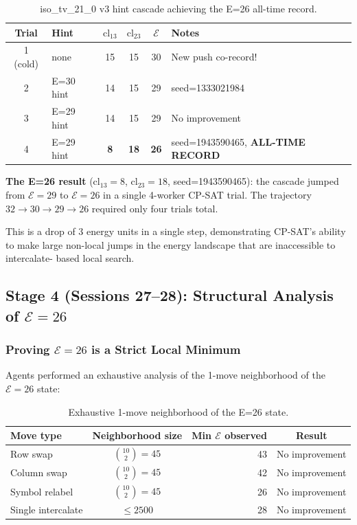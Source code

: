 \documentclass[11pt,a4paper]{article}
\theoremstyle{remark}
\newcommand{\cl}{\mathrm{cl}}
\newcommand{\E}{\mathcal{E}}
\begin{document}
\begin{table}[h]
\centering
\caption{iso\_tv\_21\_0 v3 hint cascade achieving the E=26 all-time record.}\label{tab:e26cascade}
\begin{tabular}{clcccl}
\toprule
Trial & Hint & $\cl_{13}$ & $\cl_{23}$ & $\E$ & Notes\\
\midrule
1 (cold) & none & 15 & 15 & 30 & New push co-record!\\
2 & E=30 hint & 14 & 15 & 29 & seed=1333021984\\
3 & E=29 hint & 14 & 15 & 29 & No improvement\\
4 & E=29 hint & \textbf{8} & \textbf{18} & \textbf{26} & seed=1943590465, \textbf{ALL-TIME RECORD}\\
\bottomrule
\end{tabular}
\end{table}

\textbf{The E=26 result} ($\cl_{13}=8$, $\cl_{23}=18$, seed=1943590465): the cascade
jumped from $\E=29$ to $\E=26$ in a single 4-worker CP-SAT trial. The trajectory
$32 \to 30 \to 29 \to 26$ required only four trials total.

This is a drop of 3 energy units in a single step, demonstrating CP-SAT's ability to
make large non-local jumps in the energy landscape that are inaccessible to intercalate-
based local search.

\subsection{Stage 4 (Sessions 27--28): Structural Analysis of $\E=26$}

\subsubsection{Proving $\E=26$ is a Strict Local Minimum}

Agents performed an exhaustive analysis of the 1-move neighborhood of the $\E=26$ state:

\begin{table}[h]
\centering
\caption{Exhaustive 1-move neighborhood of the E=26 state.}\label{tab:e26nbhd}
\begin{tabular}{lcrc}
\toprule
Move type & Neighborhood size & Min $\E$ observed & Result\\
\midrule
Row swap & $\binom{10}{2}=45$ & 43 & No improvement\\
Column swap & $\binom{10}{2}=45$ & 42 & No improvement\\
Symbol relabel & $\binom{10}{2}=45$ & 26 & No improvement\\
Single intercalate & $\leq 2500$ & 28 & No improvement\\
\bottomrule
\end{tabular}
\end{table}
\end{document}
